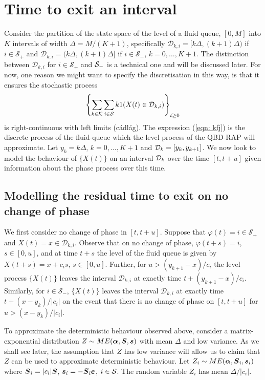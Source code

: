 \section{Time to exit an interval}\label{sec: modelling}
Consider the partition of the state space of the level of a fluid queue, \([0,M]\) into \(K\) intervals of width \(\Delta = M/(K+1)\), specifically \(\mathcal D_{k,i} = [k\Delta,(k+1)\Delta)\) if \(i\in\mathcal S_+\) and \(\mathcal D_{k,i} = (k\Delta,(k+1)\Delta]\) if \(i\in\mathcal S_-\), \(k=0,\dots,K+1\). The distinction between \(\mathcal D_{k,i}\) for \(i\in\mathcal S_+\) and \(\mathcal{S}_-\) is a technical one and will be discussed later. For now, one reason we might want to specify the discretisation in this way, is that it ensures the stochastic process 
\begin{align}
	\displaystyle \left\{\sum_{k\in\mathcal K}\sum_{i\in\mathcal{S}} k1(X(t)\in\mathcal{D}_{k,i})\right\}_{t\geq 0} \label{eqn: kfj}
\end{align}
is right-continuous with left limits (c\'adl\'ag). The expression (\ref{eqn: kfj}) is the discrete process of the fluid-queue which the level process of the QBD-RAP will approximate. Let \(y_k = k\Delta\), \(k=0,\dots,K+1\) and \(\mathcal{D}_k = [y_k,y_{k+1}]\). We now look to model the behaviour of \(\{X(t)\}\) on an interval \(\mathcal{D}_k\) over the time \([t,t+u]\) given information about the phase process over this time. 

\subsection{Modelling the residual time to exit on no change of phase} 
We first consider no change of phase in \([t,t+u]\). Suppose that \(\varphi(t)=i\in\mathcal S_+\) and \(X(t) = x\in\mathcal D_{k,i}\). Observe that on no change of phase, \(\varphi(t+s) = i\), \(s\in[0,u]\), and at time \(t+s\) the level of the fluid queue is given by \(X(t+s) = x+c_i s\), \(s\in[0,u]\). Further, for \(u>(y_{k+1}-x)/c_i\) the level process \(\{X(t)\}\) leaves the interval \(\mathcal D_{k,i}\) at exactly time \(t+(y_{k+1} - x)/c_i\). Similarly, for \(i\in\mathcal S_-\), \(\{X(t)\}\) leaves the interval \(\mathcal D_{k,i}\) at exactly time \(t+(x-y_k)/|c_i|\) on the event that there is no change of phase on \([t,t+u]\) for \(u>(x-y_k)/|c_i|\). 

To approximate the deterministic behaviour observed above, consider a matrix-exponential distribution \(Z\sim ME(\boldsymbol \alpha, \boldsymbol S, \boldsymbol s)\) with mean \(\Delta\) and low variance. As we shall see later, the assumption that \(Z\) has low variance will allow us to claim that \(Z\) can be used to approximate deterministic behaviour. Let \(Z_i\sim ME(\boldsymbol \alpha, \boldsymbol S_i, \boldsymbol s_i)\) where \(\boldsymbol S_i = |c_i|\boldsymbol S\), \(\boldsymbol s_i=-\boldsymbol S_i\boldsymbol e\), \(i\in\mathcal{S}\). The random variable \(Z_i\) has mean \(\Delta/|c_i|\). 

